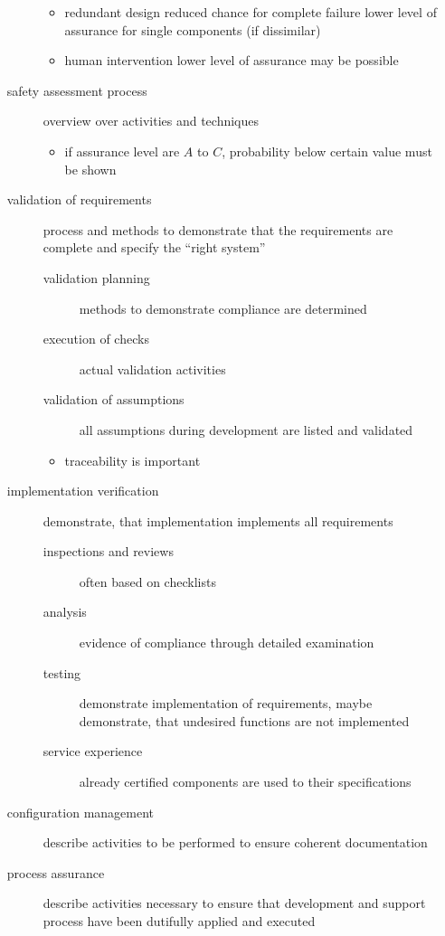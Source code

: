 \documentclass[a4paper, 10pt]{article}
\begin{document}
\begin{itemize}
\begin{description}
\begin{itemize}
            \item redundant design \follows reduced chance for complete failure \follows lower level of assurance for single components (if dissimilar)
            \item human intervention \follows lower level of assurance may be possible
        \end{itemize}
        \item[safety assessment process] overview over activities and techniques
        \begin{itemize}
            \item if assurance level are $A$ to $C$, probability below certain value must be shown
        \end{itemize}
        \item[validation of requirements] process and methods to demonstrate that the requirements are complete and specify the ``right system''
        \begin{description}
            \item[validation planning] methods to demonstrate compliance are determined
            \item[execution of checks] actual validation activities
            \item[validation of assumptions] all assumptions during development are listed and validated
        \end{description}
        \begin{itemize}
            \item traceability is important
        \end{itemize}
        \item[implementation verification] demonstrate, that implementation implements all requirements
        \begin{description}
            \item[inspections and reviews] often based on checklists
            \item[analysis] evidence of compliance through detailed examination
            \item[testing] demonstrate implementation of requirements, maybe demonstrate, that undesired functions are not implemented
            \item[service experience] already certified components are used to their specifications
        \end{description}
        \item[configuration management] describe activities to be performed to ensure coherent documentation
        \item[process assurance] describe activities necessary to ensure that development and support process have been dutifully applied and executed
    \end{description}
\end{itemize}
\end{document}
